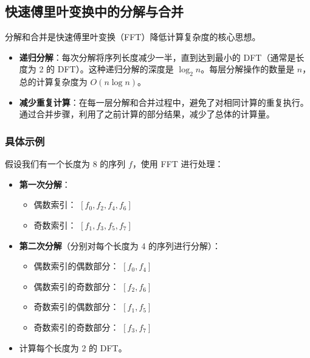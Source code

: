 \documentclass{ctexart}
\begin{document}
\subsection{快速傅里叶变换中的分解与合并}

分解和合并是快速傅里叶变换（FFT）降低计算复杂度的核心思想。

\begin{itemize}
    \item \textbf{递归分解}：每次分解将序列长度减少一半，直到达到最小的 DFT（通常是长度为 2 的 DFT）。这种递归分解的深度是 \( \log_2 n \)。每层分解操作的数量是 \( n \)，总的计算复杂度为 \( O(n \log n) \)。
    
    \item \textbf{减少重复计算}：在每一层分解和合并过程中，避免了对相同计算的重复执行。通过合并步骤，利用了之前计算的部分结果，减少了总体的计算量。
\end{itemize}

\subsubsection{具体示例}

假设我们有一个长度为 8 的序列 \( f \)，使用 FFT 进行处理：

\begin{itemize}
    \item \textbf{第一次分解}：
    \begin{itemize}
        \item 偶数索引： \( [f_0, f_2, f_4, f_6] \)
        \item 奇数索引： \( [f_1, f_3, f_5, f_7] \)
    \end{itemize}

    \item \textbf{第二次分解}（分别对每个长度为 4 的序列进行分解）：
    \begin{itemize}
        \item 偶数索引的偶数部分： \( [f_0, f_4] \)
        \item 偶数索引的奇数部分： \( [f_2, f_6] \)
        \item 奇数索引的偶数部分： \( [f_1, f_5] \)
        \item 奇数索引的奇数部分： \( [f_3, f_7] \)
    \end{itemize}

    \item 计算每个长度为 2 的 DFT。

\end{itemize}
\end{document}

